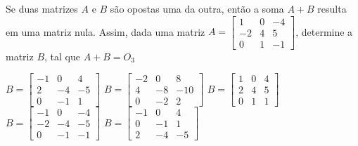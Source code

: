 Se duas matrizes $A$ e $B$ são opostas uma da outra, então a soma $A+B$ resulta em uma matriz nula. Assim, dada uma matriz $A = \left[ \begin{array}{ccc}
1 & 0 & -4 \\
-2 & 4 & 5 \\
0 & 1 & -1
\end{array} \right]$, determine a matriz $B$, tal que $A+B=O_3$

$B = \left[ \begin{array}{ccc} -1 & 0 & 4 \\ 2 & -4 & -5 \\ 0 & -1 & 1 \end{array} \right]$
$B = \left[ \begin{array}{ccc} -2 & 0 & 8 \\ 4 & -8 & -10 \\ 0 & -2 & 2 \end{array} \right]$
$B = \left[ \begin{array}{ccc} 1 & 0 & 4 \\ 2 & 4 & 5 \\ 0 & 1 & 1 \end{array} \right]$
$B = \left[ \begin{array}{ccc} -1 & 0 & -4 \\ -2 & -4 & -5 \\ 0 & -1 & -1 \end{array} \right]$
$B = \left[ \begin{array}{ccc} -1 & 0 & 4 \\ 0 & -1 & 1 \\ 2 & -4 & -5 \end{array} \right]$


